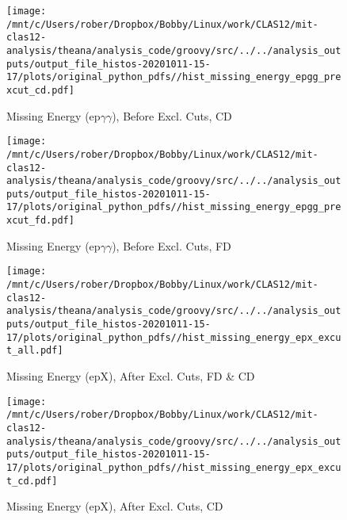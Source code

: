 \documentclass{article}
\begin{document}
\begin{landscape}
    \begin{figure}[h]
        \centering

        \texttt{[image: /mnt/c/Users/rober/Dropbox/Bobby/Linux/work/CLAS12/mit-clas12-analysis/theana/analysis\_code/groovy/src/../../analysis\_outputs/output\_file\_histos-20201011-15-17/plots/original\_python\_pdfs//hist\_missing\_energy\_epgg\_prexcut\_cd.pdf]}
        \captionsetup{textformat=empty,labelformat=blank}
        \caption{Missing Energy (ep$\gamma$$\gamma$), Before Excl. Cuts, CD}
    \end{figure}
    \clearpage
    
    \begin{figure}[h]
        \centering

        \texttt{[image: /mnt/c/Users/rober/Dropbox/Bobby/Linux/work/CLAS12/mit-clas12-analysis/theana/analysis\_code/groovy/src/../../analysis\_outputs/output\_file\_histos-20201011-15-17/plots/original\_python\_pdfs//hist\_missing\_energy\_epgg\_prexcut\_fd.pdf]}
        \captionsetup{textformat=empty,labelformat=blank}
        \caption{Missing Energy (ep$\gamma$$\gamma$), Before Excl. Cuts, FD}
    \end{figure}
    \clearpage
    
    \begin{figure}[h]
        \centering

        \texttt{[image: /mnt/c/Users/rober/Dropbox/Bobby/Linux/work/CLAS12/mit-clas12-analysis/theana/analysis\_code/groovy/src/../../analysis\_outputs/output\_file\_histos-20201011-15-17/plots/original\_python\_pdfs//hist\_missing\_energy\_epx\_excut\_all.pdf]}
        \captionsetup{textformat=empty,labelformat=blank}
        \caption{Missing Energy (epX), After Excl. Cuts, FD \& CD}
    \end{figure}
    \clearpage
    
    \begin{figure}[h]
        \centering

        \texttt{[image: /mnt/c/Users/rober/Dropbox/Bobby/Linux/work/CLAS12/mit-clas12-analysis/theana/analysis\_code/groovy/src/../../analysis\_outputs/output\_file\_histos-20201011-15-17/plots/original\_python\_pdfs//hist\_missing\_energy\_epx\_excut\_cd.pdf]}
        \captionsetup{textformat=empty,labelformat=blank}
        \caption{Missing Energy (epX), After Excl. Cuts, CD}
    \end{figure}
    \clearpage
    
    \begin{figure}[h]
        \centering


\end{figure}
\end{landscape}
\end{document}
